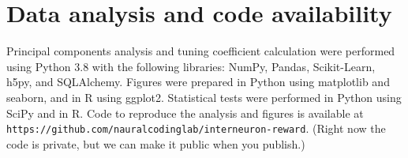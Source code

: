 \documentclass{article}
\begin{document}
\section{Data analysis and code availability}

Principal components analysis and tuning coefficient calculation were performed
using Python 3.8 with the following libraries: NumPy, Pandas, Scikit-Learn,
h5py, and SQLAlchemy. Figures were prepared in Python using matplotlib and
seaborn, and in R using ggplot2. Statistical tests were performed in Python
using SciPy and in R. Code to reproduce the analysis and figures is available
at \texttt{https://github.com/nauralcodinglab/interneuron-reward}. (Right now the
code is private, but we can make it public when you publish.)
\end{document}
